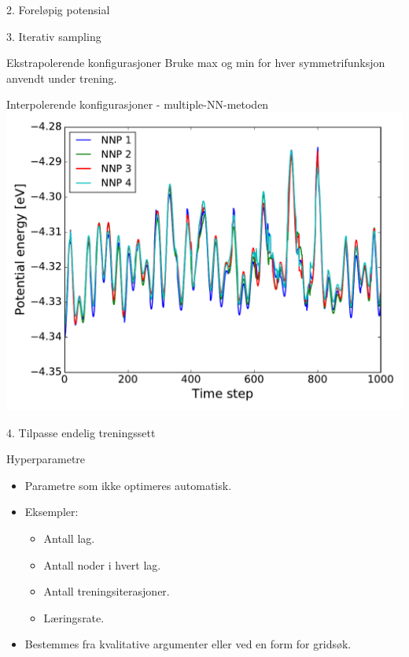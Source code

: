 \documentclass{beamer}
\begin{document}
\begin{frame}{2. Foreløpig potensial}
\end{frame}


\begin{frame}{3. Iterativ sampling}
\begin{block}{Ekstrapolerende konfigurasjoner}
 Bruke max og min for hver symmetrifunksjon anvendt under trening. 
\end{block}

\begin{block}{Interpolerende konfigurasjoner - multiple-NN-metoden}
 \centering
 \includegraphics[width = 0.7\linewidth]{../Figures/Results/multipleNNP.pdf}
\end{block}

\end{frame}


\begin{frame}{4. Tilpasse endelig treningssett}

\begin{block}{Hyperparametre}
 \begin{itemize}
  \item Parametre som ikke optimeres automatisk. 
  \item Eksempler: 
  \begin{itemize}
   \item Antall lag. 
   \item Antall noder i hvert lag. 
   \item Antall treningsiterasjoner. 
   \item Læringsrate. 
  \end{itemize} 
  \item Bestemmes fra kvalitative argumenter eller ved en form for gridsøk. 
 \end{itemize}

\end{block}

\end{frame}
\end{document}
